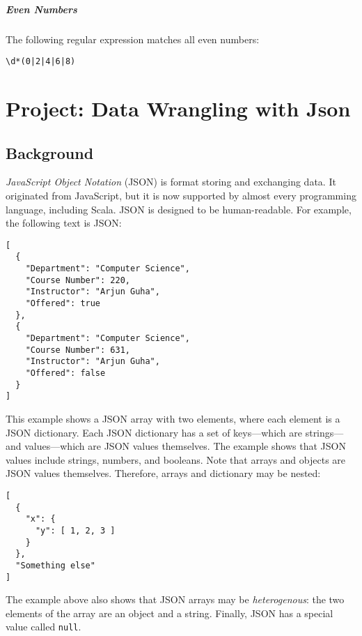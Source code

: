 \documentclass[9pt]{extbook}
\begin{document}
\paragraph{Even Numbers}

The following regular expression matches all even numbers:

\begin{verbatim}
\d*(0|2|4|6|8)
\end{verbatim}

















\chapter{Project: Data Wrangling with Json}

\section{Background}

\emph{JavaScript Object Notation} (JSON) is format storing and
exchanging data. It originated from JavaScript, but it is now supported by
almost every programming language, including Scala. JSON is designed
to be human-readable. For example, the following text is JSON:
%
\lstset{language=console}
\begin{lstlisting}
[
  {
    "Department": "Computer Science",
    "Course Number": 220,
    "Instructor": "Arjun Guha",
    "Offered": true
  },
  {
    "Department": "Computer Science",
    "Course Number": 631,
    "Instructor": "Arjun Guha",
    "Offered": false
  }
]
\end{lstlisting}
%
This example shows a JSON array with two elements, where each element is a
JSON dictionary. Each JSON dictionary has a set of keys---which are strings---and
values---which are JSON values themselves. The example shows that JSON values include
strings, numbers, and booleans. Note that arrays and objects are JSON values
themselves. Therefore, arrays and dictionary may be nested:
\lstset{language=console}
\begin{lstlisting}
[
  {
    "x": {
      "y": [ 1, 2, 3 ]
    }
  },
  "Something else"
]
\end{lstlisting}
%
The example above also shows that JSON arrays may be \emph{heterogenous}:
the two elements of the array are an object and a string.
Finally, JSON has a special value called \lstinline|null|.
\end{document}
